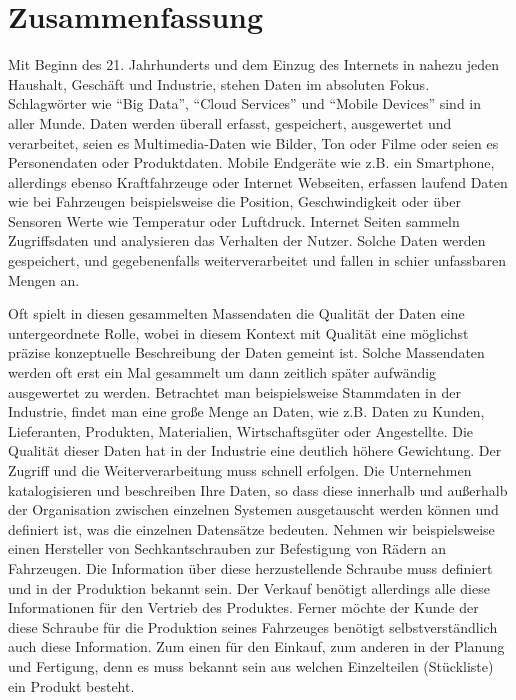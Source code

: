 \chapter*{Zusammenfassung}


Mit Beginn des 21. Jahrhunderts und dem Einzug des Internets in nahezu jeden Haushalt, Geschäft und Industrie, stehen Daten im absoluten Fokus. Schlagwörter wie \enquote{Big Data}, \enquote{Cloud Services} und \enquote{Mobile Devices} sind in aller Munde. Daten werden überall erfasst, gespeichert, ausgewertet und verarbeitet, seien es Multimedia-Daten wie Bilder, Ton oder Filme oder seien es Personendaten oder Produktdaten. Mobile Endgeräte wie z.B. ein Smartphone, allerdings ebenso Kraftfahrzeuge oder Internet Webseiten, erfassen laufend Daten wie bei Fahrzeugen beispielsweise die Position, Geschwindigkeit oder über Sensoren Werte wie Temperatur oder Luftdruck. Internet Seiten sammeln Zugriffsdaten und analysieren das Verhalten der Nutzer. Solche Daten werden gespeichert, und gegebenenfalls weiterverarbeitet und fallen in schier unfassbaren Mengen an. 

Oft spielt in diesen gesammelten Massendaten die Qualität der Daten eine untergeordnete Rolle, wobei in diesem Kontext mit Qualität eine möglichst präzise konzeptuelle Beschreibung der Daten gemeint ist. Solche Massendaten werden oft erst ein Mal gesammelt um dann zeitlich später aufwändig ausgewertet zu werden.
Betrachtet man beispielsweise Stammdaten in der Industrie, findet man eine große Menge an Daten, wie z.B. Daten zu Kunden, Lieferanten, Produkten, Materialien, Wirtschaftsgüter oder Angestellte. Die Qualität dieser Daten hat in der Industrie eine deutlich höhere Gewichtung. Der Zugriff und die Weiterverarbeitung muss schnell erfolgen. Die Unternehmen katalogisieren und beschreiben Ihre Daten, so dass diese innerhalb und außerhalb der Organisation zwischen einzelnen Systemen ausgetauscht werden können und definiert ist, was die einzelnen Datensätze bedeuten. Nehmen wir beispielsweise einen Hersteller von Sechkantschrauben zur Befestigung von Rädern an Fahrzeugen. Die Information über diese herzustellende Schraube muss definiert und in der Produktion bekannt sein. Der Verkauf benötigt allerdings alle diese Informationen für den Vertrieb des Produktes. Ferner möchte der Kunde der diese Schraube für die Produktion seines Fahrzeuges benötigt selbstverständlich auch diese Information. Zum einen für den Einkauf, zum anderen in der Planung und Fertigung, denn es muss bekannt sein aus welchen Einzelteilen (Stückliste) ein Produkt besteht. 

